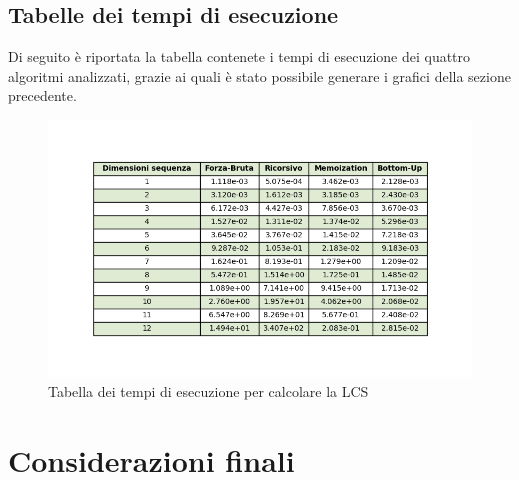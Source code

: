 \documentclass{article}
\begin{document}
\subsection{Tabelle dei tempi di esecuzione}

Di seguito è riportata la tabella contenete i tempi di esecuzione dei quattro algoritmi analizzati, grazie ai quali è stato possibile generare i grafici della sezione precedente.

\begin{figure} [!h]
    \centering
    \includegraphics[width=1\linewidth]{table/TabellaLCS.png}
    \caption{Tabella dei tempi di esecuzione per calcolare la LCS}
    \label{fig:enter-label}
\end{figure}

\newpage

\section{Considerazioni finali}
\end{document}
